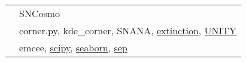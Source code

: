 \documentclass[margin]{res}
\begin{document}
\begin{resume}




\begin{tabular}{l p{4.3in}}
\hspace{-0.6em}{\bf Co-Maintainer:} & SNCosmo\\
\hspace{-0.6em}{\bf Source Code:} & 
corner.py, kde\_corner, SNANA, \href{https://github.com/conda-forge/extinction-feedstock}{extinction}, \href{https://github.com/rubind/host_unity}{UNITY}\\

\hspace{-0.6em}{\bf Documentation:} & 
emcee,
\href{https://github.com/scipy/scipy/pull/8011}{scipy},
\href{https://github.com/mwaskom/seaborn/pulls?q=is\%3Apr+author\%3Abenjaminrose}{seaborn},
\href{https://github.com/kbarbary/sep/commit/612033788bcce44f110a87e1b54bb70eea9960c2}{sep}\\


\end{tabular}
\end{resume}
\end{document}
